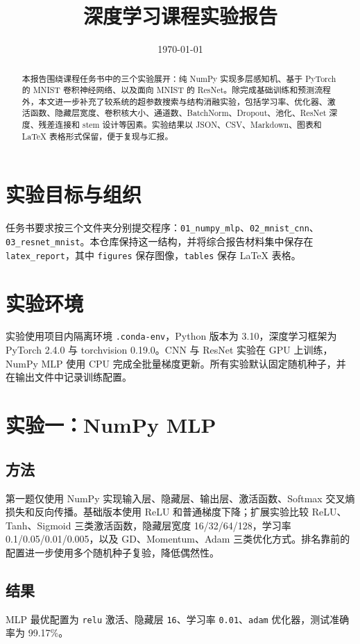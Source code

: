\documentclass[UTF8]{ctexart}
\title{深度学习课程实验报告}
\author{}
\date{\today}
\begin{document}
\maketitle

\begin{abstract}
本报告围绕课程任务书中的三个实验展开：纯 NumPy 实现多层感知机、基于 PyTorch 的 MNIST 卷积神经网络、以及面向 MNIST 的 ResNet。除完成基础训练和预测流程外，本文进一步补充了较系统的超参数搜索与结构消融实验，包括学习率、优化器、激活函数、隐藏层宽度、卷积核大小、通道数、BatchNorm、Dropout、池化、ResNet 深度、残差连接和 stem 设计等因素。实验结果以 JSON、CSV、Markdown、图表和 LaTeX 表格形式保留，便于复现与汇报。
\end{abstract}

\section{实验目标与组织}
任务书要求按三个文件夹分别提交程序：\texttt{01\_numpy\_mlp}、\texttt{02\_mnist\_cnn}、\texttt{03\_resnet\_mnist}。本仓库保持这一结构，并将综合报告材料集中保存在 \texttt{latex\_report}，其中 \texttt{figures} 保存图像，\texttt{tables} 保存 LaTeX 表格。

\section{实验环境}
实验使用项目内隔离环境 \texttt{.conda-env}，Python 版本为 3.10，深度学习框架为 PyTorch 2.4.0 与 torchvision 0.19.0。CNN 与 ResNet 实验在 GPU 上训练，NumPy MLP 使用 CPU 完成全批量梯度更新。所有实验默认固定随机种子，并在输出文件中记录训练配置。

\section{实验一：NumPy MLP}
\subsection{方法}
第一题仅使用 NumPy 实现输入层、隐藏层、输出层、激活函数、Softmax 交叉熵损失和反向传播。基础版本使用 ReLU 和普通梯度下降；扩展实验比较 ReLU、Tanh、Sigmoid 三类激活函数，隐藏层宽度 16/32/64/128，学习率 0.1/0.05/0.01/0.005，以及 GD、Momentum、Adam 三类优化方式。排名靠前的配置进一步使用多个随机种子复验，降低偶然性。

\subsection{结果}
MLP 最优配置为 \texttt{relu} 激活、隐藏层 \texttt{16}、学习率 \texttt{0.01}、\texttt{adam} 优化器，测试准确率为 99.17\%。
\end{document}
